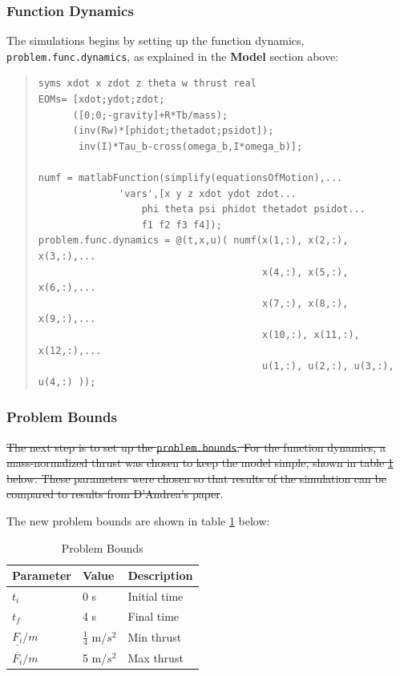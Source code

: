 \documentclass[12pt]{article}
\begin{document}
\subsubsection{Function Dynamics}
The simulations begins by setting up the function dynamics, \lstinline!problem.func.dynamics!, as explained in the \textbf{Model} section above: 
\begin{quote}
\begin{lstlisting}
syms xdot x zdot z theta w thrust real
EOMs= [xdot;ydot;zdot;
      ([0;0;-gravity]+R*Tb/mass);
      (inv(Rw)*[phidot;thetadot;psidot]);
       inv(I)*Tau_b-cross(omega_b,I*omega_b)];

numf = matlabFunction(simplify(equationsOfMotion),...
   		      'vars',[x y z xdot ydot zdot...
			      phi theta psi phidot thetadot psidot...
			      f1 f2 f3 f4]);
problem.func.dynamics = @(t,x,u)( numf(x(1,:), x(2,:), x(3,:),...
                                       x(4,:), x(5,:), x(6,:),...
                                       x(7,:), x(8,:), x(9,:),...
                                       x(10,:), x(11,:), x(12,:),...
                                       u(1,:), u(2,:), u(3,:), u(4,:) ));

\end{lstlisting}
\end{quote}

\subsubsection{Problem Bounds}
\sout{The next step is to set up the \lstinline!problem.bounds!. For the function dynamics, a mass-normalized thrust was chosen to keep the model simple, shown in table \ref{Problem Bounds} below. These parameters were chosen so that results of the simulation can be compared to results from D'Andrea's paper}\cite{D'Andrea}.

The new problem bounds are shown in table \ref{Problem Bounds} below:

\begin{table}[H]
\begin{center}
\begin{tabular}{ |p{2.5cm}||p{2cm}||p{3cm}| }

 \hline
 Parameter & Value & Description\\
 \hline
 $t_{i}$   & 0 s  & Initial time\\
 $t_{f}$  & 4 s  & Final time\\
 $\underline{F_{i}}/m$ & $\frac{1}{4}$ m/$s^{2}$ & Min thrust\\
 $\overline{F_{i}}/m$ & 5 m/$s^{2}$ & Max thrust\\
  \hline
\end{tabular}
\caption{Problem Bounds }
\label{Problem Bounds}
\end{center}
\end{table}
\end{document}
